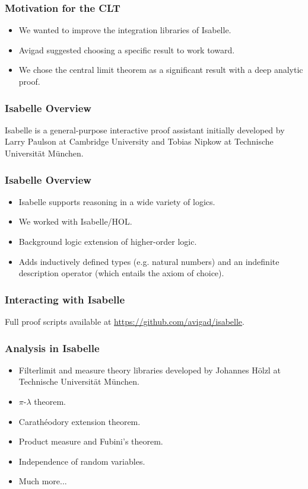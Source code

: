 \documentclass{beamer}
\begin{document}
\begin{frame}
\frametitle{Motivation for the CLT}
\begin{itemize}
\item We wanted to improve the integration libraries of Isabelle. \pause
\item Avigad suggested choosing a specific result to work toward. \pause
\item We chose the central limit theorem as a significant result with a deep analytic proof.
\end{itemize}
\end{frame}

\begin{frame}
\frametitle{Isabelle Overview}
Isabelle is a general-purpose interactive proof assistant initially developed by Larry Paulson at Cambridge University and Tobias Nipkow at Technische Universit\"at M\"unchen.
\end{frame}

\begin{frame}
\frametitle{Isabelle Overview}
\begin{itemize}
\item Isabelle supports reasoning in a wide variety of logics. \pause
\item We worked with Isabelle/HOL. \pause
\item Background logic extension of higher-order logic. \pause
\item Adds inductively defined types (e.g. natural numbers) and an indefinite description operator (which entails the axiom of choice).
\end{itemize}
\end{frame}

\begin{frame}
\frametitle{Interacting with Isabelle}
Full proof scripts available at \url{https://github.com/avigad/isabelle}.
\end{frame}

\begin{frame}
\frametitle{Analysis in Isabelle}
\begin{itemize}
\item Filterlimit and measure theory libraries developed by Johannes H\"olzl at Technische Universit\"at M\"unchen. \pause
\item $\pi$-$\lambda$ theorem. \pause
\item Carath\'eodory extension theorem. \pause
\item Product measure and Fubini's theorem. \pause
\item Independence of random variables. \pause
\item Much more...
\end{itemize}
\end{frame}
\end{document}
